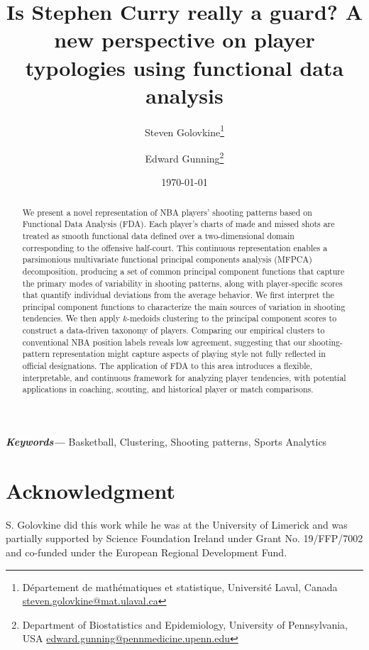 \documentclass{article}
\title{Is Stephen Curry really a guard? A new perspective on player typologies using functional data analysis}
\author{%
Steven Golovkine\thanks{Département de mathématiques et statistique, Université Laval, Canada \href{mailto:steven.golovkine@mat.ulaval.ca}{steven.golovkine@mat.ulaval.ca}}
\and
Edward Gunning\thanks{Department of Biostatistics and Epidemiology, University of Pennsylvania, USA \href{mailto:edward.gunning@pennmedicine.upenn.edu}{edward.gunning@pennmedicine.upenn.edu}}
}
\date{\today}
\providecommand{\keywords}[1]{\textbf{\textit{Keywords---}} #1}
\begin{document}
\maketitle

\begin{abstract}
	We present a novel representation of NBA players' shooting patterns based on Functional Data Analysis (FDA). Each player's charts of made and missed shots are treated as smooth functional data defined over a two-dimensional domain corresponding to the offensive half-court. This continuous representation enables a parsimonious multivariate functional principal components analysis (MFPCA) decomposition, producing a set of common principal component functions that capture the primary modes of variability in shooting patterns, along with player-specific scores that quantify individual deviations from the average behavior. We first interpret the principal component functions to characterize the main sources of variation in shooting tendencies. We then apply $k$-medoids clustering to the principal component scores to construct a data-driven taxonomy of players. Comparing our empirical clusters to conventional NBA position labels reveals low agreement, suggesting that our shooting-pattern representation might capture aspects of playing style not fully reflected in official designations.
    {\color{blue}The application of FDA to this area introduces} a flexible, interpretable, and continuous framework for analyzing player tendencies, with potential applications in coaching, scouting, and historical player or match comparisons.

\end{abstract}

\keywords{Basketball, Clustering, Shooting patterns, Sports Analytics}











\newpage
\setcounter{equation}{0}
\renewcommand{\theequation}{A.\arabic{equation}}
\begin{appendix}

	

\end{appendix}

\section*{Acknowledgment}

S. Golovkine did this work while he was at the University of Limerick and was partially supported by Science Foundation Ireland under Grant No. 19/FFP/7002 and co-funded under the European Regional Development Fund.



\end{document}
